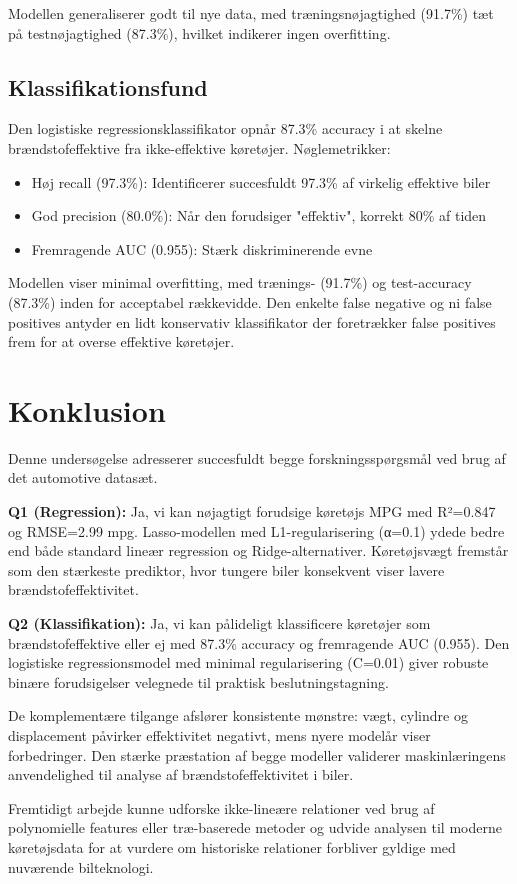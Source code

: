 \documentclass[a4paper, twocolumn]{article}
\begin{document}
Modellen generaliserer godt til nye data, med træningsnøjagtighed (91.7\%) tæt på testnøjagtighed (87.3\%), hvilket indikerer ingen overfitting.

\subsection{Klassifikationsfund}
Den logistiske regressionsklassifikator opnår 87.3\% accuracy i at skelne brændstofeffektive fra ikke-effektive køretøjer. Nøglemetrikker:

\begin{itemize}
\item Høj recall (97.3\%): Identificerer succesfuldt 97.3\% af virkelig effektive biler
\item God precision (80.0\%): Når den forudsiger "effektiv", korrekt 80\% af tiden
\item Fremragende AUC (0.955): Stærk diskriminerende evne
\end{itemize}

Modellen viser minimal overfitting, med trænings- (91.7\%) og test-accuracy (87.3\%) inden for acceptabel rækkevidde. Den enkelte false negative og ni false positives antyder en lidt konservativ klassifikator der foretrækker false positives frem for at overse effektive køretøjer.

\section{Konklusion}
\label{sec:conclusion}

Denne undersøgelse adresserer succesfuldt begge forskningsspørgsmål ved brug af det automotive datasæt.

\textbf{Q1 (Regression):} Ja, vi kan nøjagtigt forudsige køretøjs MPG med R²=0.847 og RMSE=2.99 mpg. Lasso-modellen med L1-regularisering (α=0.1) ydede bedre end både standard lineær regression og Ridge-alternativer. Køretøjsvægt fremstår som den stærkeste prediktor, hvor tungere biler konsekvent viser lavere brændstofeffektivitet.

\textbf{Q2 (Klassifikation):} Ja, vi kan pålideligt klassificere køretøjer som brændstofeffektive eller ej med 87.3\% accuracy og fremragende AUC (0.955). Den logistiske regressionsmodel med minimal regularisering (C=0.01) giver robuste binære forudsigelser velegnede til praktisk beslutningstagning.

De komplementære tilgange afslører konsistente mønstre: vægt, cylindre og displacement påvirker effektivitet negativt, mens nyere modelår viser forbedringer. Den stærke præstation af begge modeller validerer maskinlæringens anvendelighed til analyse af brændstofeffektivitet i biler.

Fremtidigt arbejde kunne udforske ikke-lineære relationer ved brug af polynomielle features eller træ-baserede metoder og udvide analysen til moderne køretøjsdata for at vurdere om historiske relationer forbliver gyldige med nuværende bilteknologi.
\end{document}
